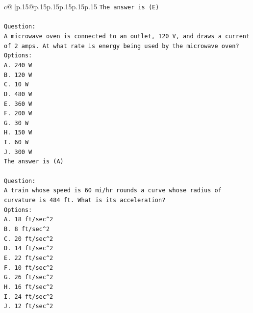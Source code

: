 \documentclass{article}
\begin{document}
{\begin{supertabular}{c@{$\;$}|p{.15\linewidth}@{}p{.15\linewidth}p{.15\linewidth}p{.15\linewidth}p{.15\linewidth}p{.15\linewidth}}
{{{\texttt{The answer is (E)} \\
\\ 
\texttt{Question:} \\
\texttt{A microwave oven is connected to an outlet, 120 V, and draws a current of 2 amps. At what rate is energy being used by the microwave oven?} \\
\texttt{Options:} \\
\texttt{A. 240 W} \\
\texttt{B. 120 W} \\
\texttt{C. 10 W} \\
\texttt{D. 480 W} \\
\texttt{E. 360 W} \\
\texttt{F. 200 W} \\
\texttt{G. 30 W} \\
\texttt{H. 150 W} \\
\texttt{I. 60 W} \\
\texttt{J. 300 W} \\
\texttt{The answer is (A)} \\
\\ 
\texttt{Question:} \\
\texttt{A train whose speed is 60 mi/hr rounds a curve whose radius of curvature is 484 ft. What is its acceleration?} \\
\texttt{Options:} \\
\texttt{A. 18 ft/sec\^{}2} \\
\texttt{B. 8 ft/sec\^{}2} \\
\texttt{C. 20 ft/sec\^{}2} \\
\texttt{D. 14 ft/sec\^{}2} \\
\texttt{E. 22 ft/sec\^{}2} \\
\texttt{F. 10 ft/sec\^{}2} \\
\texttt{G. 26 ft/sec\^{}2} \\
\texttt{H. 16 ft/sec\^{}2} \\
\texttt{I. 24 ft/sec\^{}2} \\
\texttt{J. 12 ft/sec\^{}2} \\
            }
        }
    }
     \\ \\


\end{supertabular}}
\end{document}
